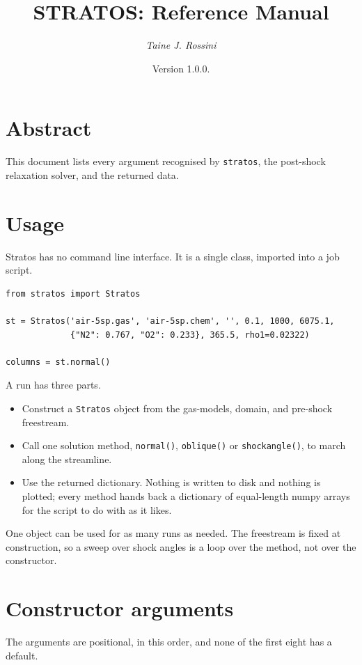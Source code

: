 \documentclass[10pt,a4paper]{article}
\title{STRATOS: Reference Manual}
\author{\textit{Taine J. Rossini}}
\date{Version 1.0.0.}
\renewcommand{\_}{\origunderscore\penalty4000\relax}
\begin{document}
\maketitle

\section*{Abstract}

This document lists every argument recognised by \texttt{stratos}, the post-shock relaxation solver, and the returned data.

\section*{Usage}

Stratos has no command line interface. It is a single class, imported into a job script.

\begin{lstlisting}
from stratos import Stratos

st = Stratos('air-5sp.gas', 'air-5sp.chem', '', 0.1, 1000, 6075.1,
             {"N2": 0.767, "O2": 0.233}, 365.5, rho1=0.02322)

columns = st.normal()
\end{lstlisting}

A run has three parts.

\begin{itemize}
    \item Construct a \texttt{Stratos} object from the gas-models, domain, and pre-shock freestream.
    \item Call one solution method, \texttt{normal()}, \texttt{oblique()} or \texttt{shock\_angle()}, to march along the streamline.
    \item Use the returned dictionary. Nothing is written to disk and nothing is plotted; every method hands back a dictionary of equal-length numpy arrays for the script to do with as it likes.
\end{itemize}

One object can be used for as many runs as needed. The freestream is fixed at construction, so a sweep over shock angles is a loop over the method, not over the constructor.

\section*{Constructor arguments}

The arguments are positional, in this order, and none of the first eight has a default.
\end{document}
